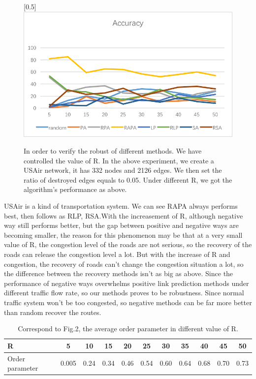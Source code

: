 \documentclass[onecolumn,preprintnumbers,amsmath,amssymb]{revtex4}
\begin{document}
\begin{figure}[ht]
\scalebox{0.5}[0.5]{\includegraphics[trim=0 10 0 0]{baFlow.png}}
\caption{In order to verify  the robust of different methods. We have controlled the value of R. In the above experiment, we create a USAir network, it has 332 nodes and 2126 edges. We then set the ratio of destroyed edges equals to 0.05. Under different R, we got the algorithm's performance as above.}\label{BAZD}
\end{figure}


USAir is a kind of transportation system. We can see RAPA always performs best, then follows as RLP, RSA.With the increasement of R, although negative way still performs better, but the gap between positive and negative ways are becoming smaller, the reason for this phenomenon may be that at a very small value of R, the congestion  level of the roads are not serious, so the recovery of the roads can release the congestion  level a lot. But with the increase of R and congestion, the recovery of roads can't change the congestion  situation a lot, so the difference between the recovery methods isn't as big as above. Since the performance of negative ways overwhelms positive link prediction methods under different traffic flow rate, so our methods proves to be robustness. Since normal traffic system won't be too congested, so negative methods can be far more better than random recover the routes. 


\begin{table}[tbp]
\centering  %
\begin{tabular}{lcccccccccc}  %
\hline  %
R &5 &10 &15 &20 &25 &30 &35 &40 &45 &50\\ 
\hline  Order parameter &0.005 &0.24 &0.34 &0.46 &0.54 &0.60 &0.64 &0.68 &0.70 &0.73\\  
\hline
\end{tabular}
\caption{Correspond to Fig.2, the average order parameter in different value of R. }
\end{table}
\end{document}
